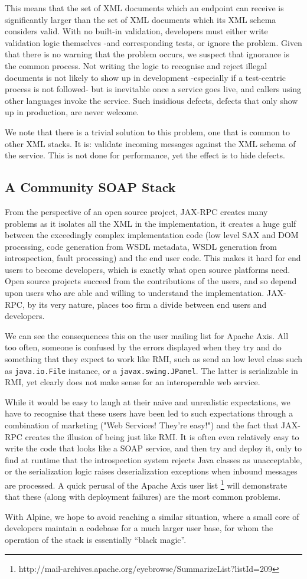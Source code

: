 This means that the set of XML documents which an endpoint can
receive is significantly larger than the set of XML documents which
its XML schema considers valid. With no built-in
validation, developers must either write validation logic themselves
-and corresponding tests, or ignore the problem. Given that there is
no warning that the problem occurs, we suspect that ignorance is the
common process. Not writing the logic to recognise and reject illegal
documents is not likely to show up in development -especially if a
test-centric process is not followed- but is inevitable once a service
goes live, and callers using other languages invoke the service. Such
insidious defects, defects that only show up in production, are never
welcome.

We note that there is a trivial solution to this problem, one that is
common to other XML stacks. It is: validate incoming messages against
the XML schema of the service. This is not done for performance, yet
the effect is to hide defects.


\subsection{A Community SOAP Stack}
\label{alpine:community}
From the perspective of an open source project, JAX-RPC creates
many problems as it isolates all the XML in the implementation, it
creates a huge gulf between the exceedingly complex implementation
code (low level SAX and DOM processing, code generation from WSDL
metadata, WSDL generation from introspection, fault processing) and
the end user code.  This makes it hard for end users to become
developers, which is exactly what open source platforms need. Open
source projects succeed from the contributions of the users, and so
depend upon users who are able and willing to understand the
implementation. JAX-RPC, by its very nature, places too firm a divide
between end users and developers.

We can see the consequences this on the user mailing list for Apache
Axis. All too often, someone is confused by the errors displayed when
they try and do something that they expect to work like RMI, such as
send an low level class such as \verb|java.io.File| instance, or a
\verb|javax.swing.JPanel|. The latter is serializable in RMI, yet
clearly does not make sense for an interoperable web service.

While it would be easy to laugh at their na\"{i}ve and unrealistic
expectations, we have to recognise that these users have been led to
such expectations through a combination of marketing ("Web Services!
They're easy!") and the fact that JAX-RPC creates the illusion of
being just like RMI. It is often even relatively easy to write the
code that looks like a SOAP service, and then try and deploy it, only
to find at runtime that the introspection system rejects Java classes
as unacceptable, or the serialization logic raises deserialization
exceptions when inbound messages are processed. A quick perusal of the
Apache Axis user list
\footnote{http://mail-archives.apache.org/eyebrowse/SummarizeList?listId=209}
will demonstrate that these (along with deployment failures) are the
most common problems.

With Alpine, we hope to avoid reaching a similar situation, where a
small core of developers maintain a codebase for a much larger user
base, for whom the operation of the stack is essentially ``black
magic''. 
